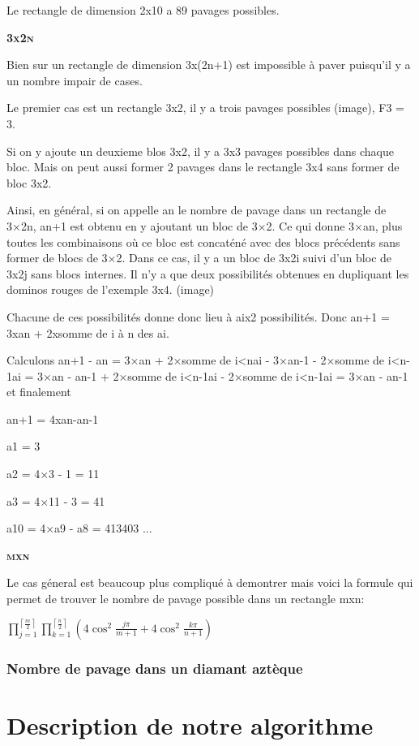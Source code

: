\documentclass{article}
\begin{document}
Le rectangle de dimension 2x10 a 89 pavages possibles.



\textbf{\textsc{3x2n}}


Bien sur un rectangle de dimension 3x(2n+1) est impossible à paver puisqu'il y a un nombre impair de cases.

Le premier cas est un rectangle 3x2, il y a trois pavages possibles (image), F3 = 3.

Si on y ajoute un deuxieme blos 3x2, il y a 3x3 pavages possibles dans chaque bloc.
Mais on peut aussi former 2 pavages dans le rectangle 3x4 sans former de bloc 3x2.

Ainsi, en général, si on appelle an le nombre de pavage dans un rectangle de 3×2n, an+1 est obtenu en y ajoutant un bloc de 3×2.
Ce qui donne 3×an, plus toutes les combinaisons où ce bloc est concaténé avec des blocs précédents sans former de blocs de 3×2.
Dans ce cas, il y a un bloc de 3x2i suivi d'un bloc de 3x2j sans blocs internes. Il n'y a que deux possibilités obtenues en dupliquant les dominos rouges de l'exemple 3x4. (image)

Chacune de ces possibilités donne donc lieu à aix2 possibilités.
Donc an+1 = 3xan + 2xsomme de i à n des ai.

Calculons an+1 - an = 3×an + 2×somme de i<nai - 3×an-1 - 2×somme de i<n-1ai = 3×an - an-1 + 2×somme de i<n-1ai - 2×somme de i<n-1ai = 3×an - an-1 et finalement

an+1 = 4xan-an-1

a1 = 3

a2 = 4×3 - 1 = 11

a3 = 4×11 - 3 = 41

a10 = 4×a9 - a8 = 413403 ...


\textbf{\textsc{mxn}}

Le cas géneral est beaucoup plus compliqué à demontrer mais voici la formule qui permet de trouver le nombre de pavage possible dans un rectangle mxn:

$\prod_{j=1}^{\left \lceil \frac{m}{2} \right \rceil} \prod_{k=1}^{\left \lceil \frac{n}{2} \right \rceil}\left ( 4\cos^{2}\frac{j\pi }{m+1}+4\cos^{2}\frac{k\pi }{n+1} \right )$


\subsubsection{Nombre de pavage dans un diamant aztèque}



\section{Description de notre algorithme}
\end{document}
